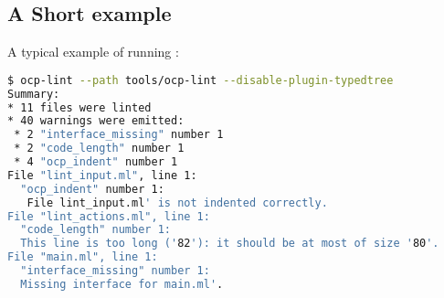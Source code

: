\subsection{A Short example}

A typical example of running \ocplint{}:
\begin{lstlisting}[language=bash,basicstyle=\tt\small]
$ ocp-lint --path tools/ocp-lint --disable-plugin-typedtree
Summary:
* 11 files were linted
* 40 warnings were emitted:
 * 2 "interface_missing" number 1
 * 2 "code_length" number 1
 * 4 "ocp_indent" number 1
File "lint_input.ml", line 1:
  "ocp_indent" number 1:
   File lint_input.ml' is not indented correctly.
File "lint_actions.ml", line 1:
  "code_length" number 1:
  This line is too long ('82'): it should be at most of size '80'.
File "main.ml", line 1:
  "interface_missing" number 1:
  Missing interface for main.ml'.
\end{lstlisting}                %
